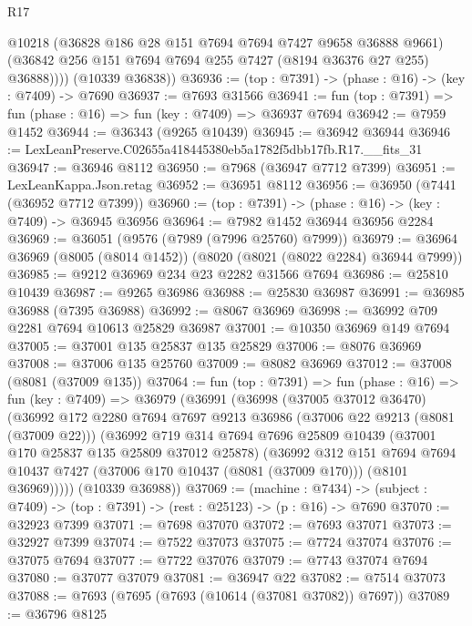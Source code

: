 \begin{lexlean}{R17}
\begin{coremodule}
            @10218
            (@36828 @186 @28 @151 @7694 @7694 @7427 @9658 @36888 @9661)
            (@36842 @256 @151 @7694 @7694 @255 @7427 (@8194 @36376 @27 @255) @36888))))
      (@10339 @36838))
@36936 := (top : @7391) -> (phase : @16) -> (key : @7409) -> @7690
@36937 := @7693 @31566
@36941 := fun (top : @7391) => fun (phase : @16) => fun (key : @7409) => @36937 @7694
@36942 := @7959 @1452
@36944 := @36343 (@9265 @10439)
@36945 := @36942 @36944
@36946 := LexLeanPreserve.C02655a418445380eb5a1782f5dbb17fb.R17.__fits_31
@36947 := @36946 @8112
@36950 := @7968 (@36947 @7712 @7399)
@36951 := LexLeanKappa.Json.retag
@36952 := @36951 @8112
@36956 := @36950 (@7441 (@36952 @7712 @7399))
@36960 := (top : @7391) -> (phase : @16) -> (key : @7409) -> @36945 @36956
@36964 := @7982 @1452 @36944 @36956 @2284
@36969 := @36051 (@9576 (@7989 (@7996 @25760) @7999))
@36979 := @36964 @36969 (@8005 (@8014 @1452)) (@8020 (@8021 (@8022 @2284) @36944 @7999))
@36985 := @9212 @36969 @234 @23 @2282 @31566 @7694
@36986 := @25810 @10439
@36987 := @9265 @36986
@36988 := @25830 @36987
@36991 := @36985 @36988 (@7395 @36988)
@36992 := @8067 @36969
@36998 := @36992 @709 @2281 @7694 @10613 @25829 @36987
@37001 := @10350 @36969 @149 @7694
@37005 := @37001 @135 @25837 @135 @25829
@37006 := @8076 @36969
@37008 := @37006 @135 @25760
@37009 := @8082 @36969
@37012 := @37008 (@8081 (@37009 @135))
@37064 := fun (top : @7391) =>
  fun (phase : @16) =>
  fun (key : @7409) =>
  @36979
    (@36991
      (@36998
        (@37005 @37012 @36470)
        (@36992
          @172
          @2280
          @7694
          @7697
          @9213
          @36986
          (@37006 @22 @9213 (@8081 (@37009 @22)))
          (@36992
            @719
            @314
            @7694
            @7696
            @25809
            @10439
            (@37001 @170 @25837 @135 @25809 @37012 @25878)
            (@36992
              @312
              @151
              @7694
              @7694
              @10437
              @7427
              (@37006 @170 @10437 (@8081 (@37009 @170)))
              (@8101 @36969)))))
      (@10339 @36988))
@37069 := (machine : @7434) ->
  (subject : @7409) -> (top : @7391) -> (rest : @25123) -> (p : @16) -> @7690
@37070 := @32923 @7399
@37071 := @7698 @37070
@37072 := @7693 @37071
@37073 := @32927 @7399
@37074 := @7522 @37073
@37075 := @7724 @37074
@37076 := @37075 @7694
@37077 := @7722 @37076
@37079 := @7743 @37074 @7694
@37080 := @37077 @37079
@37081 := @36947 @22
@37082 := @7514 @37073
@37088 := @7693 (@7695 (@7693 (@10614 (@37081 @37082)) @7697))
@37089 := @36796 @8125

\end{coremodule}
\end{lexlean}
